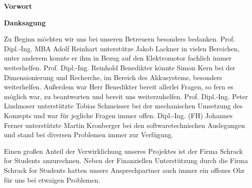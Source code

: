 \begin{center}
\begin{huge}
\textbf{Vorwort}
\end{huge}
\end{center}

\bigskip
{}


\newpage
\thispagestyle{empty}
\mbox{}
\newpage

\begin{center}
\begin{huge}
\textbf{Danksagung}
\end{huge}
\end{center}
\vspace{1cm}

Zu Beginn möchten wir uns bei unseren Betreuern besonders bedanken. Prof. Dipl.-Ing. MBA Adolf Reinhart unterstütze Jakob Lackner in vielen Bereichen, unter anderem konnte er ihm in Bezug auf den Elektromotor fachlich immer weiterhelfen. Prof. Dipl.-Ing. Reinhold Benedikter könnte Simon Kern bei der Dimensionierung und Recherche, im Bereich des Akkusystems, besonders weiterhelfen. Außerdem war Herr Benedikter bereit allerlei Fragen, so fern es möglich war, zu beantworten und bereit uns weiterzuhelfen. Prof. Dipl.-Ing. Peter Lindmoser unterstützte Tobias Schmeisser bei der mechanischen Umsetzung des Konzepts und war für jegliche Fragen immer offen. Dipl.-Ing. (FH) Johannes Ferner unterstützte Martin Kronberger bei den softwaretechnischen Auslegungen und stand bei diversen Problemen immer zur Verfügung.

Einen großen Anteil der Verwirklichung unseres Projektes ist der Firma Schrack for Students anzurechnen. Neben der Finanziellen Unterstützung durch die Firma Schrack for Students hatten unsere Ansprechpartner auch immer ein offenes Ohr für uns bei etwaigen Problemen.

